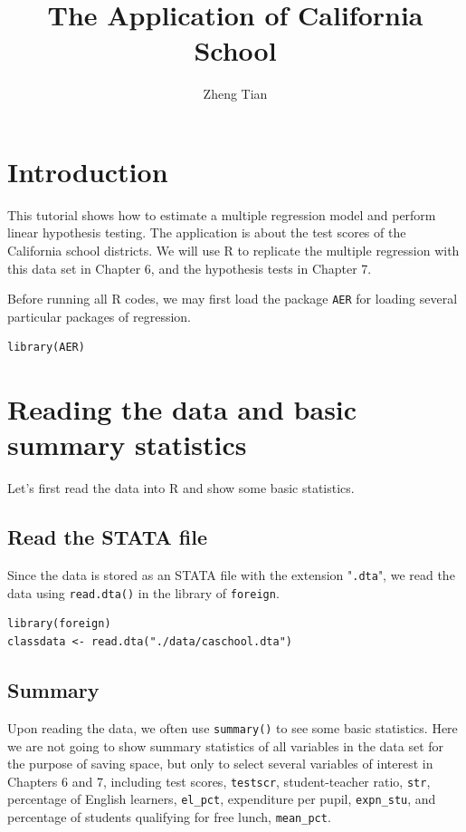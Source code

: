 \documentclass[a4paper,11pt]{article}
\author{Zheng Tian}
\date{}
\title{The Application of California School}
\begin{document}
\maketitle

\section{Introduction}
\label{sec:org66610f3}

This tutorial shows how to estimate a multiple regression model
and perform linear hypothesis testing. The application is about the
test scores of the California school districts. We will use R to
replicate the multiple regression with this data set in Chapter 6, and
the hypothesis tests in Chapter 7.

Before running all R codes, we may first load the package \texttt{AER} for loading several
particular packages of regression.
\begin{verbatim}
library(AER)
\end{verbatim}

\section{Reading the data and basic summary statistics}
\label{sec:org4bf98a7}
Let's first read the data into R and show some basic statistics.
\subsection*{Read the STATA file}
\label{sec:orgc3f0252}
Since the data is stored as an STATA file with the extension
  "\texttt{.dta}", we read the data using \texttt{read.dta()} in the library of
  \texttt{foreign}.

\begin{verbatim}
library(foreign)
classdata <- read.dta("./data/caschool.dta")
\end{verbatim}

\subsection*{Summary}
\label{sec:org69a2d53}
Upon reading the data, we often use \texttt{summary()} to see some basic
statistics. Here we are not going to show summary statistics of all
variables in the data set for the purpose of saving space, but only to
select several variables of interest in Chapters 6 and 7, including
test scores, \texttt{testscr}, student-teacher ratio, \texttt{str}, percentage of
English learners, \texttt{el\_pct}, expenditure per pupil, \texttt{expn\_stu}, and
percentage of students qualifying for free lunch, \texttt{mean\_pct}.
\end{document}
